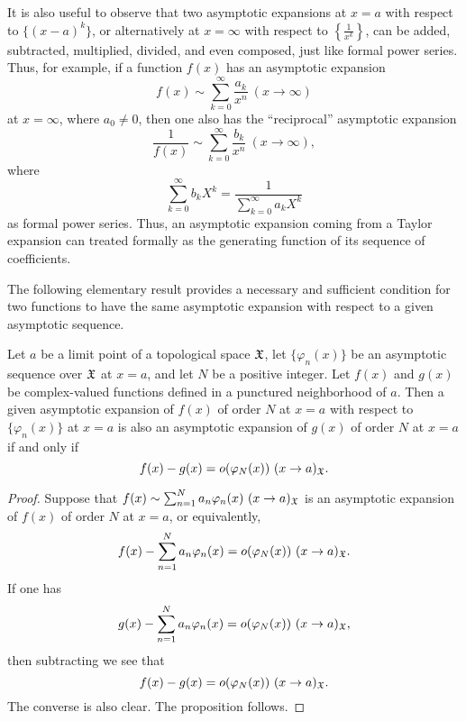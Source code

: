 \documentclass[12pt]{article}
\begin{document}
It is also useful to observe that two asymptotic expansions at $x = a$ with respect to  $\{(x-a)^k\}$, or alternatively at  $x = \infty$ with respect to $\left\{ \frac{1}{x^k}\right\}$, can be added, subtracted, multiplied, divided, and even composed, just like formal power series.  Thus, for example, if a function $f(x)$ has an asymptotic expansion
$$f(x) \sim \sum_{k = 0}^\infty \frac{a_k}{x^n} \ (x \to \infty)$$
at $x = \infty$,  where $a_0 \neq 0$, then one also has the ``reciprocal'' asymptotic expansion
$$\frac{1}{f(x)} \sim \sum_{k = 0}^\infty \frac{b_k}{x^n} \ (x \to \infty),$$
 where
$$\sum_{k = 0}^\infty b_k X^k  = \frac{1}{\sum_{k = 0}^\infty a_k X^k}$$
as formal power series.   Thus, an asymptotic expansion coming from a Taylor expansion can treated formally as the generating function of its sequence of coefficients.

The following elementary result provides a necessary and sufficient condition for two functions to have the same asymptotic expansion with respect to a given asymptotic sequence.  

\begin{proposition}\label{asympprop}
Let $a$ be a limit point of a topological space ${\mathfrak X}$, let $\{\varphi_n(x)\}$ be an asymptotic sequence over ${\mathfrak X}$ at $x = a$, and let $N$ be a positive integer.  Let $f(x)$ and $g(x)$ be complex-valued functions defined in a punctured neighborhood of $a$.  Then a given asymptotic expansion of $f(x)$ of order $N$ at $x = a$  with respect to $\{\varphi_n(x)\}$ at $x = a$ is also an asymptotic expansion of  $g(x)$ of order $N$ at $x = a$ if and only if
$$f(x)-g(x) = o(\varphi_N(x)) \ (x \to a)_{\mathfrak X}.$$
\end{proposition}

\begin{proof}
Suppose that $f(x) \sim \sum_{n = 1}^N a_n \varphi_n(x) \ (x \to a)_{\mathfrak X}$ is an asymptotic expansion of $f(x)$ of order $N$ at $x = a$, or equivalently,
$$f(x)-  \sum_{n = 1}^N a_n \varphi_n(x) = o(\varphi_N(x)) \ (x \to a)_{\mathfrak X}.$$ 
If one has
$$g(x)-  \sum_{n = 1}^N a_n \varphi_n(x) = o(\varphi_N(x)) \ (x \to a)_{\mathfrak X},$$
then subtracting we see that
$$f(x)- g(x) = o(\varphi_N(x)) \ (x \to a)_{\mathfrak X}.$$ 
The converse is also clear.  The proposition follows.
\end{proof}

\end{document}
